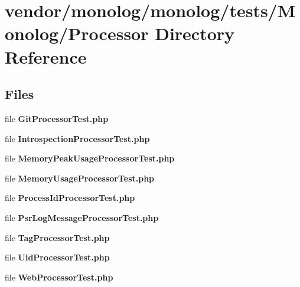 \section{vendor/monolog/monolog/tests/\+Monolog/\+Processor Directory Reference}
\label{dir_71b880c28523e4eb9fadd344dd92f8bc}
\subsection*{Files}
\begin{DoxyCompactItemize}
\item 
file {\bf Git\+Processor\+Test.\+php}
\item 
file {\bf Introspection\+Processor\+Test.\+php}
\item 
file {\bf Memory\+Peak\+Usage\+Processor\+Test.\+php}
\item 
file {\bf Memory\+Usage\+Processor\+Test.\+php}
\item 
file {\bf Process\+Id\+Processor\+Test.\+php}
\item 
file {\bf Psr\+Log\+Message\+Processor\+Test.\+php}
\item 
file {\bf Tag\+Processor\+Test.\+php}
\item 
file {\bf Uid\+Processor\+Test.\+php}
\item 
file {\bf Web\+Processor\+Test.\+php}
\end{DoxyCompactItemize}
